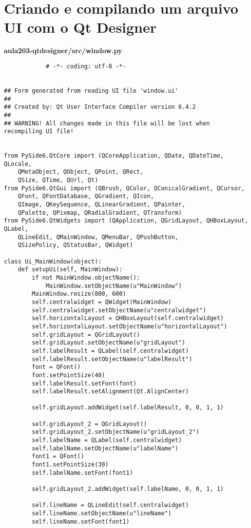 \documentclass[12pt,a4paper]{article}
\begin{document}
    \section{Criando e compilando um arquivo UI com o Qt Designer}
        \textbf{aula203-qtdesigner/src/window.py}
        \begin{lstlisting}
            # -*- coding: utf-8 -*-


## Form generated from reading UI file 'window.ui'
##
## Created by: Qt User Interface Compiler version 6.4.2
##
## WARNING! All changes made in this file will be lost when recompiling UI file!


from PySide6.QtCore import (QCoreApplication, QDate, QDateTime, QLocale,
    QMetaObject, QObject, QPoint, QRect,
    QSize, QTime, QUrl, Qt)
from PySide6.QtGui import (QBrush, QColor, QConicalGradient, QCursor,
    QFont, QFontDatabase, QGradient, QIcon,
    QImage, QKeySequence, QLinearGradient, QPainter,
    QPalette, QPixmap, QRadialGradient, QTransform)
from PySide6.QtWidgets import (QApplication, QGridLayout, QHBoxLayout, QLabel,
    QLineEdit, QMainWindow, QMenuBar, QPushButton,
    QSizePolicy, QStatusBar, QWidget)

class Ui_MainWindow(object):
    def setupUi(self, MainWindow):
        if not MainWindow.objectName():
            MainWindow.setObjectName(u"MainWindow")
        MainWindow.resize(800, 600)
        self.centralwidget = QWidget(MainWindow)
        self.centralwidget.setObjectName(u"centralwidget")
        self.horizontalLayout = QHBoxLayout(self.centralwidget)
        self.horizontalLayout.setObjectName(u"horizontalLayout")
        self.gridLayout = QGridLayout()
        self.gridLayout.setObjectName(u"gridLayout")
        self.labelResult = QLabel(self.centralwidget)
        self.labelResult.setObjectName(u"labelResult")
        font = QFont()
        font.setPointSize(40)
        self.labelResult.setFont(font)
        self.labelResult.setAlignment(Qt.AlignCenter)

        self.gridLayout.addWidget(self.labelResult, 0, 0, 1, 1)

        self.gridLayout_2 = QGridLayout()
        self.gridLayout_2.setObjectName(u"gridLayout_2")
        self.labelName = QLabel(self.centralwidget)
        self.labelName.setObjectName(u"labelName")
        font1 = QFont()
        font1.setPointSize(30)
        self.labelName.setFont(font1)

        self.gridLayout_2.addWidget(self.labelName, 0, 0, 1, 1)

        self.lineName = QLineEdit(self.centralwidget)
        self.lineName.setObjectName(u"lineName")
        self.lineName.setFont(font1)


\end{lstlisting}
\end{document}
